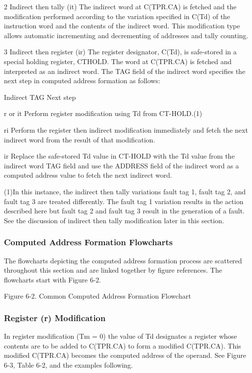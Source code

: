 2 Indirect then tally (it) The indirect word at C(TPR.CA) is fetched and the
modification performed according to the variation specified in C(Td) of the
instruction word and the contents of the indirect word. This modification type
allows automatic incrementing and decrementing of addresses and tally counting.

3 Indirect then register (ir) The register designator, C(Td), is safe-stored in a special holding register, CTHOLD. The word at C(TPR.CA) is fetched and interpreted as an indirect word. The TAG field of the indirect word specifies the next step in computed address formation as follows:

Indirect TAG Next step

r or it Perform register modification using Td from CT-HOLD.(1)

ri Perform the register then indirect modification immediately and fetch the
next indirect word from the result of that modification.  

ir Replace the safe-stored Td value in CT-HOLD with the Td value from the
indirect word TAG field and use the ADDRESS field of the indirect word as a
computed address value to fetch the next indirect word.

(1)In this instance, the indirect then tally variations fault tag 1, fault tag
2, and fault tag 3 are treated differently. The fault tag 1 variation results
in the action described here but fault tag 2 and fault tag 3 result in the
generation of a fault. See the discussion of indirect then tally modification
later in this section.

\subsubsection{Computed Address Formation Flowcharts}

The flowcharts depicting the computed address formation process are scattered
throughout this section and are linked together by figure references. The
flowcharts start with Figure 6-2.  

Figure 6-2. Common Computed Address Formation Flowchart

\subsubsection{Register (r) Modification}

In register modification (Tm = 0) the value of Td designates a register whose
contents are to be added to C(TPR.CA) to form a modified C(TPR.CA). This
modified C(TPR.CA) becomes the computed address of the operand. See Figure 6-3,
Table 6-2, and the examples following.

